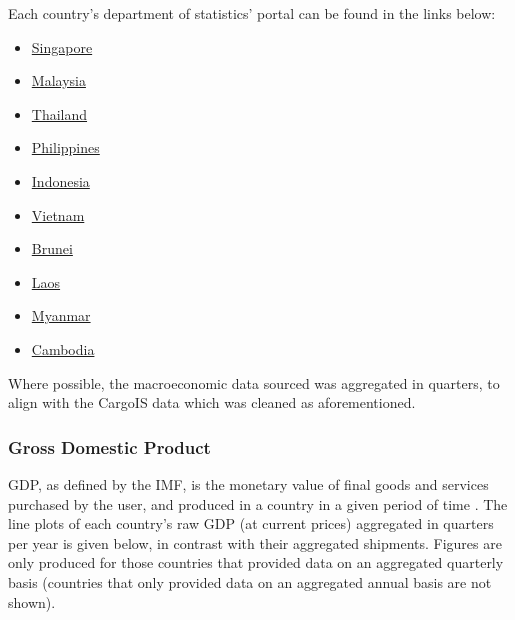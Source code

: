 \documentclass{article}
\begin{document}
\noindent Each country's department of statistics' portal can be found in the links below:

\begin{multicols}{2}
    \begin{itemize} 
        \item \href{https://www.singstat.gov.sg/}{Singapore}
        \item \href{https://www.data.gov.my/}{Malaysia}
        \item \href{https://www.nesdc.go.th/nesdb_en/main.php?filename=index}{Thailand}
        \item \href{https://psa.gov.ph/}{Philippines}
        \item \href{https://www.bps.go.id/}{Indonesia}
    \end{itemize}
    
    \columnbreak
    
    \begin{itemize}
        \item \href{https://www.gso.gov.vn/en/homepage/}{Vietnam}
        \item \href{https://deps.mofe.gov.bn/Theme/Home.aspx}{Brunei}
        \item \href{https://www.lsb.gov.la/en/home/}{Laos}
        \item \href{https://www.mmsis.gov.mm/}{Myanmar}
        \item \href{https://www.nis.gov.kh/index.php/km/}{Cambodia}
    \end{itemize}

\end{multicols} 

\noindent Where possible, the macroeconomic data sourced was aggregated in quarters, to align with the CargoIS data which was cleaned as aforementioned. 


\subsubsection{Gross Domestic Product} \label{GDP}
GDP, as defined by the IMF, is the monetary value of final goods and services purchased by the user, and produced in a country in a given period of time \cite{GDPdef}. The line plots of each country's raw GDP (at current prices) aggregated in quarters per year is given below, in contrast with their aggregated shipments. Figures are only produced for those countries that provided data on an aggregated quarterly basis (countries that only provided data on an aggregated annual basis are not shown). 
\end{document}
